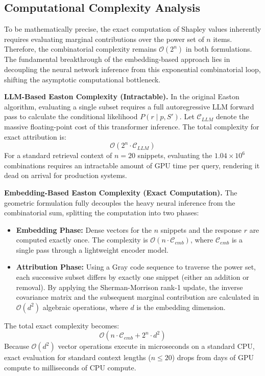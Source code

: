 \documentclass{article}
\begin{document}
\subsection{Computational Complexity Analysis}

To be mathematically precise, the exact computation of Shapley values inherently requires evaluating marginal contributions over the power set of $n$ items. Therefore, the combinatorial complexity remains $\mathcal{O}(2^n)$ in both formulations. The fundamental breakthrough of the embedding-based approach lies in decoupling the neural network inference from this exponential combinatorial loop, shifting the asymptotic computational bottleneck.

\textbf{LLM-Based Easton Complexity (Intractable).} 
In the original Easton algorithm, evaluating a single subset requires a full autoregressive LLM forward pass to calculate the conditional likelihood $P(r \mid p, S')$. Let $\mathcal{C}_{LLM}$ denote the massive floating-point cost of this transformer inference. The total complexity for exact attribution is:
$$ \mathcal{O}(2^n \cdot \mathcal{C}_{LLM}) $$
For a standard retrieval context of $n = 20$ snippets, evaluating the $1.04 \times 10^6$ combinations requires an intractable amount of GPU time per query, rendering it dead on arrival for production systems.

\textbf{Embedding-Based Easton Complexity (Exact Computation).} 
The geometric formulation fully decouples the heavy neural inference from the combinatorial sum, splitting the computation into two phases:
\begin{itemize}
    \item \textbf{Embedding Phase:} Dense vectors for the $n$ snippets and the response $r$ are computed exactly once. The complexity is $\mathcal{O}(n \cdot \mathcal{C}_{emb})$, where $\mathcal{C}_{emb}$ is a single pass through a lightweight encoder model.
    \item \textbf{Attribution Phase:} Using a Gray code sequence to traverse the power set, each successive subset differs by exactly one snippet (either an addition or removal). By applying the Sherman-Morrison rank-1 update, the inverse covariance matrix and the subsequent marginal contribution are calculated in $\mathcal{O}(d^2)$ algebraic operations, where $d$ is the embedding dimension. 
\end{itemize}
The total exact complexity becomes:
$$ \mathcal{O}(n \cdot \mathcal{C}_{emb} + 2^n \cdot d^2) $$
Because $\mathcal{O}(d^2)$ vector operations execute in microseconds on a standard CPU, exact evaluation for standard context lengths ($n \le 20$) drops from days of GPU compute to milliseconds of CPU compute.
\end{document}
